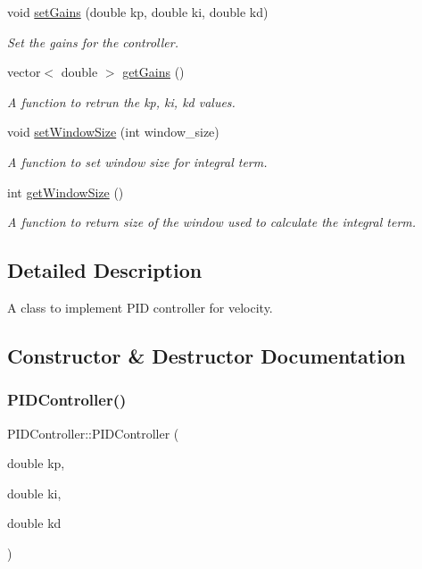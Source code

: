 \begin{DoxyCompactItemize}
void \hyperlink{classPIDController_a1d9c92c101ccdfd06e9429c896841faf}{set\+Gains} (double kp, double ki, double kd)
\begin{DoxyCompactList}\small\item\em Set the gains for the controller. \end{DoxyCompactList}\item 
vector$<$ double $>$ \hyperlink{classPIDController_a255cb698b0281918d304aaec1ea2c101}{get\+Gains} ()
\begin{DoxyCompactList}\small\item\em A function to retrun the kp, ki, kd values. \end{DoxyCompactList}\item 
void \hyperlink{classPIDController_a90f26b40532078c9018f101d20a75e42}{set\+Window\+Size} (int window\+\_\+size)
\begin{DoxyCompactList}\small\item\em A function to set window size for integral term. \end{DoxyCompactList}\item 
int \hyperlink{classPIDController_ad03be5dc276e238ea602a95fc69f146f}{get\+Window\+Size} ()
\begin{DoxyCompactList}\small\item\em A function to return size of the window used to calculate the integral term. \end{DoxyCompactList}\end{DoxyCompactItemize}


\subsection{Detailed Description}
A class to implement P\+ID controller for velocity. 

\subsection{Constructor \& Destructor Documentation}
\mbox{\label{classPIDController_aa71d105ec0ecd3c96ef1f5d3b39cce10}} 
\subsubsection{\texorpdfstring{P\+I\+D\+Controller()}{PIDController()}}
{\footnotesize\ttfamily P\+I\+D\+Controller\+::\+P\+I\+D\+Controller (\begin{DoxyParamCaption}\item[{double}]{kp,  }\item[{double}]{ki,  }\item[{double}]{kd }\end{DoxyParamCaption})}



